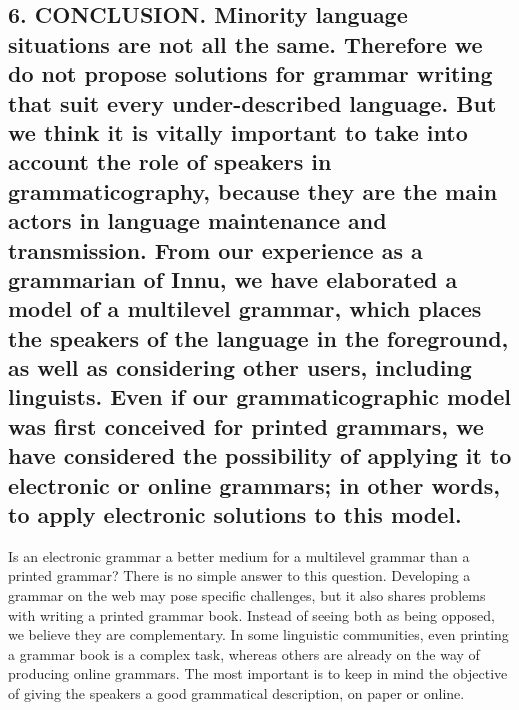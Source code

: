 \documentclass[letterpaper]{article}
\begin{document}
\subsection[6. CONCLUSION. Minority language situations are not all the same. Therefore we do not propose solutions for grammar writing that suit every under{}-described language. But we think it is vitally important to take into account the role of speakers in grammaticography, because they are the main actors in language maintenance and transmission. From our experience as a grammarian of Innu, we have elaborated a model of a multilevel grammar, which places the speakers of the language in the foreground, as well as considering other users, including linguists. Even if our grammaticographic model was first conceived for printed grammars, we have considered the possibility of applying it to electronic or online grammars; in other words, to apply electronic solutions to this model.]{6. CONCLUSION. \textmd{Minority language situations are not all the same. }\textmd{Therefore }\textmd{we do not }\textmd{propose }\textmd{solutions for grammar writing that suit every under}\textmd{{}-de}\textmd{scribed language. But we think it is }\textmd{vitally }\textmd{important to take into account the role of speakers in grammaticography, because they are the main actors in language maintenance}\textmd{ }\textmd{and transmission. From our experience as }\textmd{a }\textmd{grammarian of Innu, we have elaborated a model of }\textmd{a }\textmd{multilevel grammar, which places the speakers}\textmd{ of the language}\textmd{ in the foreground, }\textmd{as well as }\textmd{considering other users, including linguists. Even if our grammaticographic model was first }\textmd{conceived }\textmd{for printed grammars, we }\textmd{have }\textmd{considered the possibility }\textmd{of }\textmd{apply}\textmd{ing}\textmd{ it to electronic or online grammars}\textmd{; in other words}\textmd{, to apply electronic solutions to this model.}}
Is an electronic grammar a better medium for a multilevel grammar than a printed grammar? There is no simple answer to this question. Developing a grammar on the web may pose specific challenges, but it also shares problems with writing a printed grammar book. Instead of seeing both as being opposed, we believe they are complementary. In some linguistic communities, even printing a grammar book is a complex task, whereas others are already on the way of producing online grammars. The most important is to keep in mind the objective of giving the speakers a good grammatical description, on paper or online.
\end{document}
